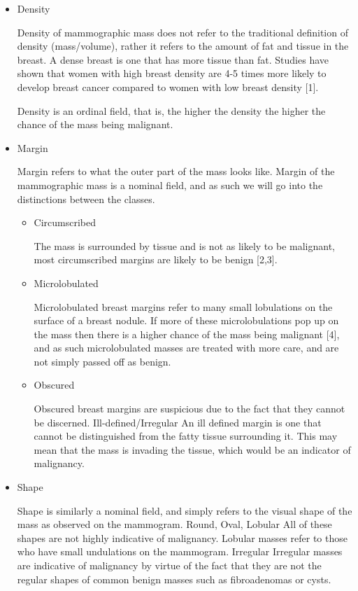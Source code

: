 \documentclass[12pt]{article}
\begin{document}
\begin{itemize}

\item Density

Density of mammographic mass does not refer to the traditional definition of density (mass/volume), rather it refers to the amount of fat and tissue in the breast. A dense breast is one that has more tissue than fat. Studies have shown that women with high breast density are 4-5 times more likely to develop breast cancer compared to women with low breast density [1]. 

Density is an ordinal field, that is, the higher the density the higher the chance of the mass being malignant.

\item Margin

Margin refers to what the outer part of the mass looks like. Margin of the mammographic mass is a nominal field, and as such we will go into the distinctions between the classes. 

\begin{itemize}

\item Circumscribed

The mass is surrounded by tissue and is not as likely to be malignant, most circumscribed margins are likely to be benign [2,3].

\item Microlobulated

Microlobulated breast margins refer to many small lobulations on the surface of a breast nodule. If more of these microlobulations pop up on the mass then there is a higher chance of the mass being malignant [4], and as such microlobulated masses are treated with more care, and are not simply passed off as benign.

\item Obscured

Obscured breast margins are suspicious due to the fact that they cannot be discerned.
Ill-defined/Irregular
An ill defined margin is one that cannot be distinguished from the fatty tissue surrounding it. This may mean that the mass is invading the tissue, which would be an indicator of malignancy.

\end{itemize}

\item Shape

Shape is similarly a nominal field, and simply refers to the visual shape of the mass as observed on the mammogram.
Round, Oval, Lobular
All of these shapes are not highly indicative of malignancy. Lobular masses refer to those who have small undulations on the mammogram.
Irregular
Irregular masses are indicative of malignancy by virtue of the fact that they are not the regular shapes of common benign masses such as fibroadenomas or cysts.

\end{itemize}
\end{document}
